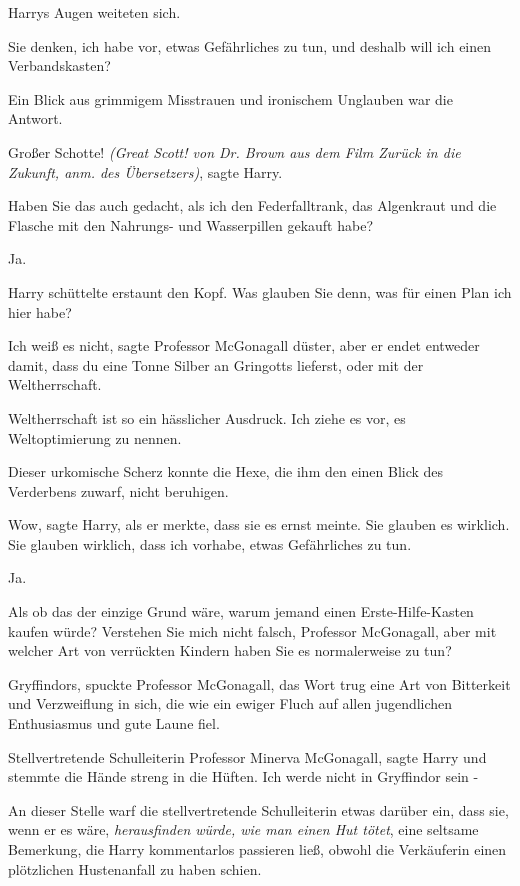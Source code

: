 Harrys Augen weiteten sich.

\glqq{}Sie denken, ich habe vor, etwas Gefährliches zu tun, und deshalb will ich
einen Verbandskasten?\grqq{}

Ein Blick aus grimmigem Misstrauen und ironischem Unglauben war die Antwort.

\glqq{}Großer Schotte!\grqq{} \emph{(\glqq{}Great Scott!\grqq{} von Dr. Brown aus dem
Film Zurück in die Zukunft, anm. des Übersetzers)}, sagte Harry.

\glqq{}Haben Sie das auch gedacht, als ich den Federfalltrank, das Algenkraut
und die Flasche mit den Nahrungs- und Wasserpillen gekauft habe?\grqq{}

\glqq{}Ja.\grqq{}

Harry schüttelte erstaunt den Kopf. \glqq{}Was glauben Sie denn, was für einen
Plan ich hier habe?\grqq{}

\glqq{}Ich weiß es nicht\grqq{}, sagte Professor McGonagall düster, \glqq{}aber
er endet entweder damit, dass du eine Tonne Silber an Gringotts lieferst, oder
mit der Weltherrschaft.\grqq{}

\glqq{}Weltherrschaft ist so ein hässlicher Ausdruck. Ich ziehe es vor, es
Weltoptimierung zu nennen.\grqq{}

Dieser urkomische Scherz konnte die Hexe, die ihm den einen Blick des Verderbens
zuwarf, nicht beruhigen.

\glqq{}Wow\grqq{}, sagte Harry, als er merkte, dass sie es ernst meinte. \glqq{}
Sie glauben es wirklich. Sie glauben wirklich, dass ich vorhabe, etwas
Gefährliches zu tun.\grqq{}

\glqq{}Ja.\grqq{}

\glqq{}Als ob das der einzige Grund wäre, warum jemand einen Erste-Hilfe-Kasten
kaufen würde? Verstehen Sie mich nicht falsch, Professor McGonagall, aber mit
welcher Art von verrückten Kindern haben Sie es normalerweise zu tun?\grqq{}

\glqq{}Gryffindors\grqq{}, spuckte Professor McGonagall, das Wort trug eine Art
von Bitterkeit und Verzweiflung in sich, die wie ein ewiger Fluch auf allen
jugendlichen Enthusiasmus und gute Laune fiel.

\glqq{}Stellvertretende Schulleiterin Professor Minerva McGonagall\grqq{}, sagte
Harry und stemmte die Hände streng in die Hüften. \glqq{}Ich werde nicht in
Gryffindor sein -\grqq{}

An dieser Stelle warf die stellvertretende Schulleiterin etwas darüber ein, dass
sie, wenn er es wäre, \emph{herausfinden würde, wie man einen Hut tötet}, eine
seltsame Bemerkung, die Harry kommentarlos passieren ließ, obwohl die
Verkäuferin einen plötzlichen Hustenanfall zu haben schien.

